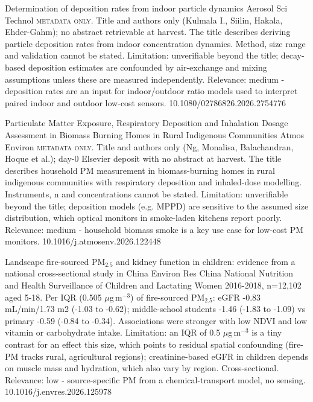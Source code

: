 \documentclass[10pt]{article}
\begin{document}
{Determination of deposition rates from indoor particle dynamics}
{Aerosol Sci Technol}
{\textsc{metadata only.} Title and authors only (Kulmala I., Siilin, Hakala, Ehder-Gahm); no abstract retrievable at harvest. The title describes deriving particle deposition rates from indoor concentration dynamics. Method, size range and validation cannot be stated. Limitation: unverifiable beyond the title; decay-based deposition estimates are confounded by air-exchange and mixing assumptions unless these are measured independently. Relevance: medium - deposition rates are an input for indoor/outdoor ratio models used to interpret paired indoor and outdoor low-cost sensors.}
{10.1080/02786826.2026.2754776}

{Particulate Matter Exposure, Respiratory Deposition and Inhalation Dosage Assessment in Biomass Burning Homes in Rural Indigenous Communities}
{Atmos Environ}
{\textsc{metadata only.} Title and authors only (Ng, Monalisa, Balachandran, Hoque et al.); day-0 Elsevier deposit with no abstract at harvest. The title describes household PM measurement in biomass-burning homes in rural indigenous communities with respiratory deposition and inhaled-dose modelling. Instruments, n and concentrations cannot be stated. Limitation: unverifiable beyond the title; deposition models (e.g. MPPD) are sensitive to the assumed size distribution, which optical monitors in smoke-laden kitchens report poorly. Relevance: medium - household biomass smoke is a key use case for low-cost PM monitors.}
{10.1016/j.atmosenv.2026.122448}

\par{}\baselineskip{}\baselineskip
{}

{Landscape fire-sourced PM$_{2.5}$ and kidney function in children: evidence from a national cross-sectional study in China}
{Environ Res}
{China National Nutrition and Health Surveillance of Children and Lactating Women 2016-2018, n=12,102 aged 5-18. Per IQR (0.505 $\mu$g\,m$^{-3}$) of fire-sourced PM$_{2.5}$: eGFR -0.83 mL/min/1.73 m2 (-1.03 to -0.62); middle-school students -1.46 (-1.83 to -1.09) vs primary -0.59 (-0.84 to -0.34). Associations were stronger with low NDVI and low vitamin or carbohydrate intake. Limitation: an IQR of 0.5 $\mu$g\,m$^{-3}$ is a tiny contrast for an effect this size, which points to residual spatial confounding (fire-PM tracks rural, agricultural regions); creatinine-based eGFR in children depends on muscle mass and hydration, which also vary by region. Cross-sectional. Relevance: low - source-specific PM from a chemical-transport model, no sensing.}
{10.1016/j.envres.2026.125978}
\end{document}
